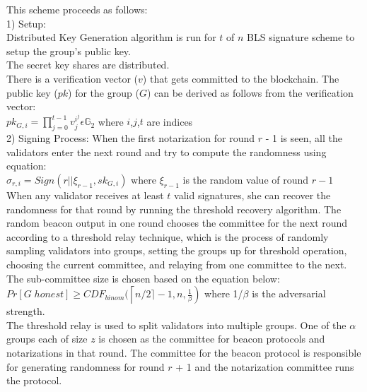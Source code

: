 \documentclass[10pt,journal,compsoc]{IEEEtran}
\begin{document}
This scheme proceeds as follows: 
\\
1) Setup:
\\
     Distributed Key Generation algorithm is run for $t$ of \indent $n$ BLS signature scheme to setup the group's public key. 
    \\
      The secret key shares are distributed. 
    \\
     There is a verification vector ($v$) that gets committed \indent to the blockchain. The public key ($pk$) for the group ($G$) \indent can be derived as follows from the verification vector: 
    \\ \indent \indent \indent $pk_{G,i} = \prod_{j=0}^{t-1} v_j^{i^j} \epsilon  \mathbb{G}_2 $ where $i$,$j$,$t$ are indices 
\\
2) Signing Process: When the first notarization for round $r$ - 1 is seen, all the validators enter the next round and try to compute the randomness using equation: 
\\ \indent \indent $\sigma_{r,i} = Sign (r || \xi_{r-1},sk_{G,i})$ where $\xi_{r-1}$ is the random \indent \indent value of round $r-1$
\\
When any validator receives at least $t$ valid signatures, she can recover the randomness for that round by running the threshold recovery algorithm. The random beacon output in one round chooses the committee for the next round according to a threshold relay technique, which is the process of randomly sampling validators into groups, setting the groups up for threshold operation, choosing the current committee, and relaying from one committee to the next.
The sub-committee size is chosen based on the equation below:
$Pr[G \; honest] \geq CDF_{binom}(\left \lceil{n/2} \rceil -1,n,\frac{1}{\beta}\right)$ where 1/$\beta$ is the adversarial strength.
\\
The threshold relay is used to split validators into multiple groups. One of the $\alpha$ groups each of size $z$ is chosen as the committee for beacon protocols and notarizations in that round. The committee for the beacon protocol is responsible for generating randomness for round $r$ + 1 and the notarization committee runs the protocol. 
\end{document}
